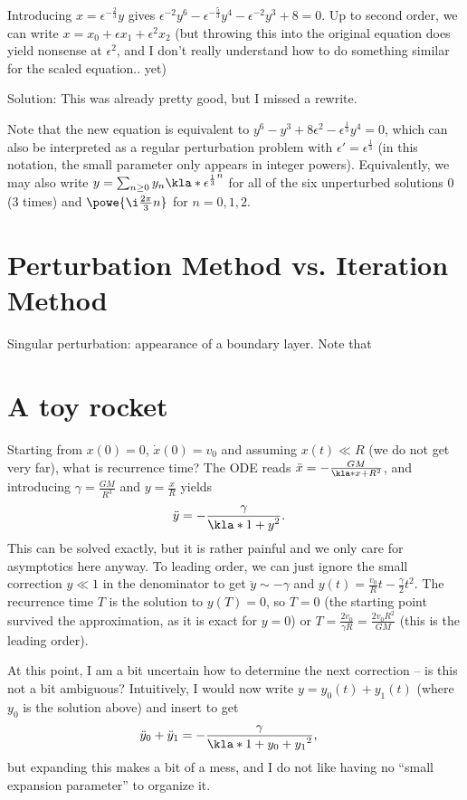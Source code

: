 \documentclass[english, parskip=full]{scrartcl}
\begin{document}
Introducing $x = \epsilon^{-\frac{2}{3}} y$ gives $\epsilon^{-2} y^6 - \epsilon^{-\frac{5}{3}} y^4 - \epsilon^{-2} y^3 + 8 = 0$.
Up to second order, we can write $x=x_0 + \epsilon x_1 + \epsilon^2 x_2$ (but throwing this into the original equation does yield nonsense at $\epsilon^2$, and I don't really understand how to do something similar for the scaled equation.. yet)


Solution: This was already pretty good, but I missed a rewrite.

Note that the new equation is equivalent to $y^6-y^3+8\epsilon^2 - \epsilon^{\frac{1}{3}} y^4 = 0$, which can also be interpreted as a regular perturbation problem with $\epsilon' = \epsilon^\frac{1}{3}$ (in this notation, the small parameter only appears in integer powers).
Equivalently, we may also write $y = \sum_{n\ge 0} y_n \kla*{\epsilon^\frac{1}{3}}^n$ for all of the six unperturbed solutions $0$ (3 times) and $\powe{\i\frac{2\pi}{3}n}$ for $n=0,1,2$.



\section{Perturbation Method vs. Iteration Method}
Singular perturbation: appearance of a boundary layer.
Note that

\section{A toy rocket}
Starting from $x(0)=0$, $\dot{x}(0)=v_0$ and assuming $x(t)\ll R$ (we do not get very far), what is recurrence time?
The ODE reads $\ddot{x} = -\frac{GM}{\kla*{x+R}^2}$, and introducing $\gamma = \frac{GM}{R^3}$ and $y= \frac{x}{R}$ yields
\begin{align}
\ddot{y} &= -\frac{\gamma}{\kla*{1+y}^2}.
\end{align}
This can be solved exactly, but it is rather painful and we only care for asymptotics here anyway.
To leading order, we can just ignore the small correction $y\ll 1$ in the denominator to get $\ddot{y} \sim -\gamma$ and $y(t) = \frac{v_0}{R}t - \frac{\gamma}{2}t^2$.
The recurrence time $T$ is the solution to $y(T)=0$, so $T=0$ (the starting point survived the approximation, as it is exact for $y=0$) or $T=\frac{2v_0}{\gamma R} = \frac{2v_0R^2}{GM}$ (this is the leading order).

At this point, I am a bit uncertain how to determine the next correction -- is this not a bit ambiguous?
Intuitively, I would now write $y=y_0(t) + y_1(t)$ (where $y_0$ is the solution above) and insert to get
\begin{align}
\ddot{y}_0 + \ddot{y}_1 &= -\frac{\gamma}{\kla*{1 + y_0 + y_1}^2},
\end{align}
but expanding this makes a bit of a mess, and I do not like having no ``small expansion parameter'' to organize it.
\end{document}

